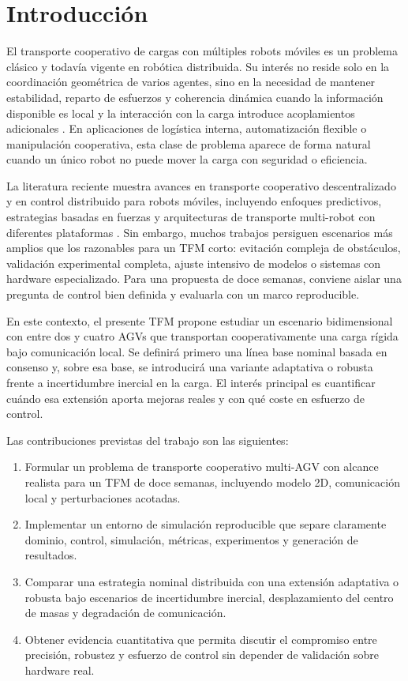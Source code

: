 \section{Introducción}

El transporte cooperativo de cargas con múltiples robots móviles es un problema clásico y todavía vigente en robótica distribuida. Su interés no reside solo en la coordinación geométrica de varios agentes, sino en la necesidad de mantener estabilidad, reparto de esfuerzos y coherencia dinámica cuando la información disponible es local y la interacción con la carga introduce acoplamientos adicionales \citep{bullo2009distributed,olfati2004consensus,ren2008distributed}. En aplicaciones de logística interna, automatización flexible o manipulación cooperativa, esta clase de problema aparece de forma natural cuando un único robot no puede mover la carga con seguridad o eficiencia.

La literatura reciente muestra avances en transporte cooperativo descentralizado y en control distribuido para robots móviles, incluyendo enfoques predictivos, estrategias basadas en fuerzas y arquitecturas de transporte multi-robot con diferentes plataformas \citep{an2023cooperative,verginis2018communication,ebel2024cooperative,rosenfelder2024force}. Sin embargo, muchos trabajos persiguen escenarios más amplios que los razonables para un TFM corto: evitación compleja de obstáculos, validación experimental completa, ajuste intensivo de modelos o sistemas con hardware especializado. Para una propuesta de doce semanas, conviene aislar una pregunta de control bien definida y evaluarla con un marco reproducible.

En este contexto, el presente TFM propone estudiar un escenario bidimensional con entre dos y cuatro AGVs que transportan cooperativamente una carga rígida bajo comunicación local. Se definirá primero una línea base nominal basada en consenso y, sobre esa base, se introducirá una variante adaptativa o robusta frente a incertidumbre inercial en la carga. El interés principal es cuantificar cuándo esa extensión aporta mejoras reales y con qué coste en esfuerzo de control.

Las contribuciones previstas del trabajo son las siguientes:
\begin{enumerate}
  \item Formular un problema de transporte cooperativo multi-AGV con alcance realista para un TFM de doce semanas, incluyendo modelo 2D, comunicación local y perturbaciones acotadas.
  \item Implementar un entorno de simulación reproducible que separe claramente dominio, control, simulación, métricas, experimentos y generación de resultados.
  \item Comparar una estrategia nominal distribuida con una extensión adaptativa o robusta bajo escenarios de incertidumbre inercial, desplazamiento del centro de masas y degradación de comunicación.
  \item Obtener evidencia cuantitativa que permita discutir el compromiso entre precisión, robustez y esfuerzo de control sin depender de validación sobre hardware real.
\end{enumerate}
